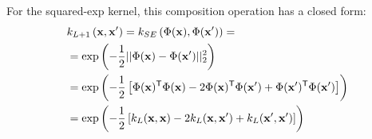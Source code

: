 \documentclass[twoside]{article}
\begin{document}
For the squared-exp kernel, this composition operation has a closed form:%
%
%
%
%
%
%
\begin{align*}
& k_{L+1} \left( {\bf{x}}, {\bf{x}}' \right) = k_{SE} \left( \Phi({\bf{x}}), \Phi({\bf{x}}') \right) = \\
& = \exp \left( -\frac{1}{2} || \Phi({\bf{x}}) - \Phi({\bf{x}}')||_2^2 \right) \nonumber\\
& = \exp\left ( -\frac{1}{2} \left[ \Phi({\bf{x}}) {^\mathsf{T}} \Phi({\bf{x}}) - 2 \Phi({\bf{x}}) {^\mathsf{T}} \Phi({\bf{x}}') + \Phi({\bf{x}}') {^\mathsf{T}} \Phi({\bf{x}}') \right] \right) \\
& = \exp \left( -\frac{1}{2} \left[ k_{L}({\bf{x}}, {\bf{x}}) - 2 k_{L}({\bf{x}}, {\bf{x}}') + k_{L}({\bf{x}}', {\bf{x}}') \right] \right)
\end{align*}
\end{document}
